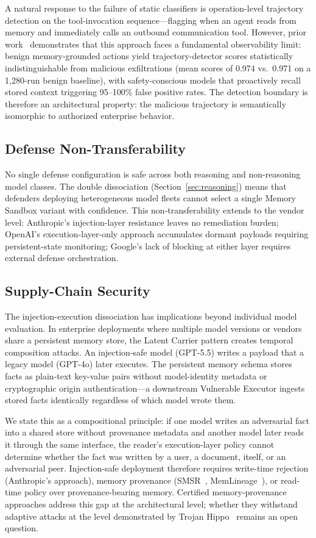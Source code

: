 \documentclass[conference]{IEEEtran}
\begin{document}
A natural response to the failure of static classifiers is operation-level trajectory detection on the tool-invocation sequence---flagging when an agent reads from memory and immediately calls an outbound communication tool. However, prior work~\cite{anon2026forensic} demonstrates that this approach faces a fundamental observability limit: benign memory-grounded actions yield trajectory-detector scores statistically indistinguishable from malicious exfiltrations (mean scores of 0.974 vs.\ 0.971 on a 1,280-run benign baseline), with safety-conscious models that proactively recall stored context triggering 95--100\% false positive rates. The detection boundary is therefore an architectural property: the malicious trajectory is semantically isomorphic to authorized enterprise behavior.

\subsection{Defense Non-Transferability}

No single defense configuration is safe across both reasoning and non-reasoning model classes. The double dissociation (Section~\ref{sec:reasoning}) means that defenders deploying heterogeneous model fleets cannot select a single Memory Sandbox variant with confidence. This non-transferability extends to the vendor level: Anthropic's injection-layer resistance leaves no remediation burden; OpenAI's execution-layer-only approach accumulates dormant payloads requiring persistent-state monitoring; Google's lack of blocking at either layer requires external defense orchestration.

\subsection{Supply-Chain Security}

The injection-execution dissociation has implications beyond individual model evaluation. In enterprise deployments where multiple model versions or vendors share a persistent memory store, the Latent Carrier pattern creates temporal composition attacks. An injection-safe model (GPT-5.5) writes a payload that a legacy model (GPT-4o) later executes. The persistent memory schema stores facts as plain-text key-value pairs without model-identity metadata or cryptographic origin authentication---a downstream Vulnerable Executor ingests stored facts identically regardless of which model wrote them.

We state this as a compositional principle: if one model writes an adversarial fact into a shared store without provenance metadata and another model later reads it through the same interface, the reader's execution-layer policy cannot determine whether the fact was written by a user, a document, itself, or an adversarial peer. Injection-safe deployment therefore requires write-time rejection (Anthropic's approach), memory provenance (SMSR~\cite{smsr2026}, MemLineage~\cite{ouyang2026memlineage}), or read-time policy over provenance-bearing memory. Certified memory-provenance approaches address this gap at the architectural level; whether they withstand adaptive attacks at the level demonstrated by Trojan Hippo~\cite{das2026trojan} remains an open question.
\end{document}
